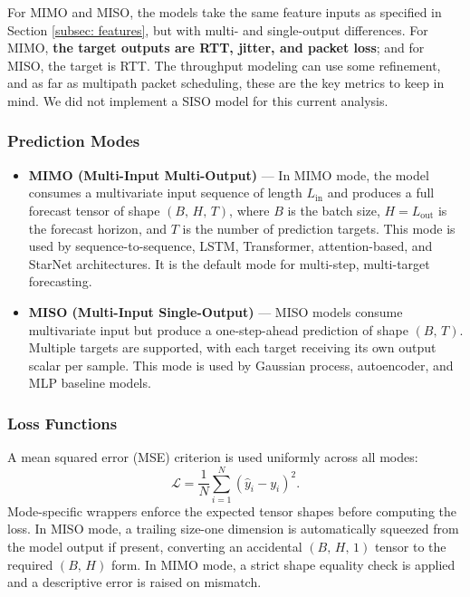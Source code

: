 \documentclass[12pt]{article}
\begin{document}
For MIMO and MISO, the models take the same feature inputs as specified in Section \ref{subsec: features}, but with multi- and single-output differences. For MIMO, \textbf{the target outputs are RTT, jitter, and packet loss}; and for MISO, the target is RTT. The throughput modeling can use some refinement, and as far as multipath packet scheduling, these are the key metrics to keep in mind. We did not implement a SISO model for this current analysis. 

\subsubsection{Prediction Modes}
\begin{itemize}
\item \textbf{MIMO (Multi-Input Multi-Output)} — In MIMO mode, the model consumes a multivariate input sequence of length $L_{\text{in}}$ and produces a full forecast tensor of shape $(B,\, H,\, T)$, where $B$ is the batch size, $H = L_{\text{out}}$ is the forecast horizon, and $T$ is the number of prediction targets. This mode is used by sequence-to-sequence, LSTM, Transformer, attention-based, and StarNet architectures. It is the default mode for multi-step, multi-target forecasting.

\item \textbf{MISO (Multi-Input Single-Output)} — MISO models consume multivariate input but produce a one-step-ahead prediction of shape $(B,\, T)$. Multiple targets are supported, with each target receiving its own output scalar per sample. This mode is used by Gaussian process, autoencoder, and MLP baseline models.


\end{itemize}

\subsubsection{Loss Functions}

A mean squared error (MSE) criterion is used uniformly across all modes:
\[
    \mathcal{L} = \frac{1}{N}\sum_{i=1}^{N}\left(\hat{y}_i - y_i\right)^2.
\]
Mode-specific wrappers enforce the expected tensor shapes before computing the loss. In MISO 
mode, a trailing size-one dimension is automatically squeezed from the model output if present, converting an accidental $(B,\, H,\, 1)$ tensor to the required $(B,\, H)$ form. In MIMO mode, a strict shape equality check is applied and a descriptive error is raised on mismatch.
\end{document}
